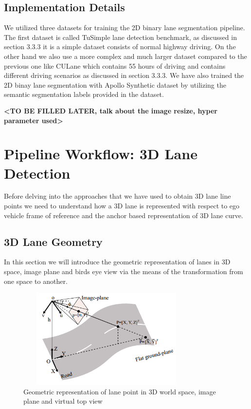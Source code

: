         \subsection{Implementation Details}
        We utilized three datasets for training the 2D binary lane segmentation pipeline. The first dataset is called TuSimple lane detection benchmark\cite{Tusimple}, as discussed in section 3.3.3 it is a simple dataset consists of normal highway driving. On the other hand we also use a more complex and much larger dataset compared to the previous one like CULane\cite{pan2018SCNN} which contains 55 hours of driving and contains different driving scenarios as discussed in section 3.3.3. We have also trained the 2D binay lane segmentation with Apollo Synthetic dataset\cite{guo2020gen} by utilizing the semantic segmentation labels provided in the dataset.   
        
        \textbf{<TO BE FILLED LATER, talk about the image resize, hyper parameter used>}
        
        
        \section{Pipeline Workflow: 3D Lane Detection }
        Before delving into the approaches that we have used to obtain 3D lane line points we need to understand how a 3D lane is represented with respect to ego vehicle frame of reference and the anchor based representation of 3D lane curve.  
        
        \subsection{3D Lane Geometry}
        In this section we will introduce the geometric representation of lanes in 3D space, image plane and birds eye view via the means of the transformation from one space to another. 
        
         \begin{figure}[h]
    \centering
    \includegraphics[width=9cm, height=5cm]{images/3d_lane_geometry.png}
    \caption{Geometric representation of lane point in 3D world space, image plane and virtual top view \cite{DBLP:journals/corr/abs-2112-15351}}
    \end{figure}
    
